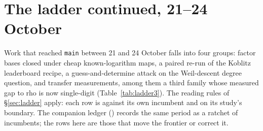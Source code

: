 \section{The ladder continued, 21--24 October}\label{sec:ladder3}

Work that reached \texttt{main} between 21 and 24 October falls into four
groups: factor bases closed under cheap known-logarithm maps, a paired
re-run of the Koblitz leaderboard recipe, a guess-and-determine attack on
the Weil-descent degree question, and transfer measurements, among them a
third family whose measured gap to rho is now single-digit
(Table~\ref{tab:ladder3}). The reading rules of \S\ref{sec:ladder} apply:
each row is against its own incumbent and on its study's boundary. The
companion ledger () records the
same period as a ratchet of incumbents; the rows here are those that move
the frontier or correct it.

